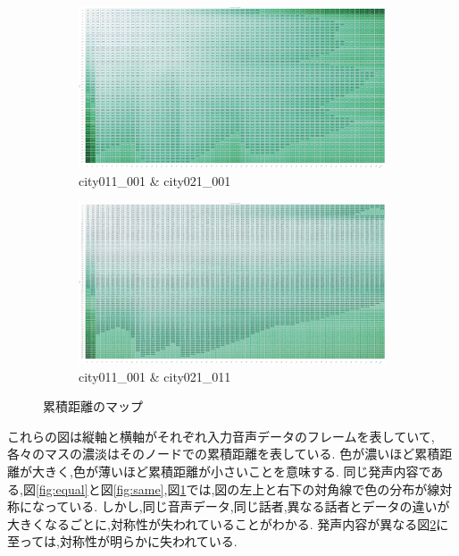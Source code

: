 \documentclass[a4paper,12pt]{article}
\begin{document}
\begin{figure}[h]
    \begin{subfigure}[b]{0.45\textwidth}
      \centering
      \includegraphics[width=\textwidth,bb=0.000000 0.000000 1329.122658 697.681395]{./diffpeople.png}
      \caption{}
      \caption{city011\_001 \& city021\_001}
      \label{fig:diffpeople}
    \end{subfigure}
    \hfill
    \begin{subfigure}[b]{0.45\textwidth}
      \centering
      \includegraphics[width=\textwidth,bb=0.000000 0.000000 1329.122658 697.681395]{./diffword.png}
      \caption{city011\_001 \& city021\_011}
      \label{fig:diffword}
    \end{subfigure}
  
    \caption{累積距離のマップ}
    \label{fig:grid}
\end{figure}

これらの図は縦軸と横軸がそれぞれ入力音声データのフレームを表していて,各々のマスの濃淡はそのノードでの累積距離を表している.
色が濃いほど累積距離が大きく,色が薄いほど累積距離が小さいことを意味する.
同じ発声内容である,図\ref{fig:equal}と図\ref{fig:same},図\ref{fig:diffpeople}では,図の左上と右下の対角線で色の分布が線対称になっている.
しかし,同じ音声データ,同じ話者,異なる話者とデータの違いが大きくなるごとに,対称性が失われていることがわかる.
発声内容が異なる図\ref{fig:diffword}に至っては,対称性が明らかに失われている.
\end{document}
